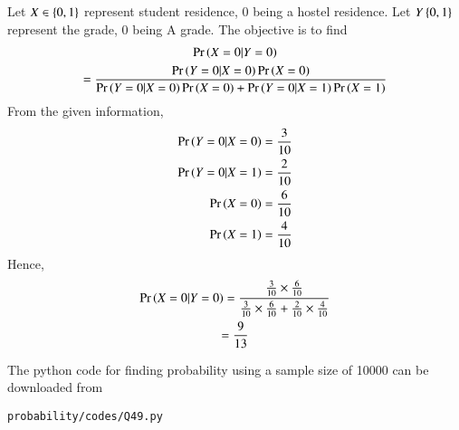 Let $X \in \left\{0,1\right\}$ represent student residence, 0 being a hostel residence.  Let $Y \left\{0,1\right\}$ represent the grade, 0 being A grade.  The objective is to find
{\footnotesize
\begin{multline}
\Pr\left(X=0|Y=0\right) 
\\
=\frac{\Pr\left(Y=0|X=0\right)\Pr\left(X=0\right)}{\Pr\left(Y=0|X=0\right)\Pr\left(X=0\right)+\Pr\left(Y=0|X=1\right)\Pr\left(X=1\right)}
\end{multline}
}
From the given information,
\begin{align}
\Pr\left(Y=0|X=0\right) &= \frac{3}{10}
\\
\Pr\left(Y=0|X=1\right) &= \frac{2}{10}
\\
\Pr\left(X = 0\right) &=\frac{6}{10}
\\
\Pr\left(X = 1\right) &=\frac{4}{10}
\end{align}
Hence,
\begin{multline}
\Pr\left(X=0|Y=0\right) =\frac{\frac{3}{10}\times\frac{6}{10}}{\frac{3}{10}\times\frac{6}{10}+\frac{2}{10}\times\frac{4}{10}}
\\
=\frac{9}{13}
\end{multline}

 The python code for finding probability using a sample size of 10000 can be downloaded from
\begin{lstlisting}
probability/codes/Q49.py
\end{lstlisting}

